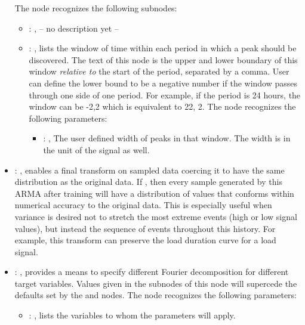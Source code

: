 \begin{itemize}
      The  node recognizes the following subnodes:
      \begin{itemize}
        \item {}: , 
          -- no description yet --

        \item {}: , 
          lists the window of time within each period in which a peak should be discovered.
          The text of this node is the upper and lower boundary of this
          window \emph{relative to} the start of the period, separated by a comma.
          User can define the lower bound to be a negative
          number if the window passes through one side of one period. For example, if the period is
          24                                                  hours, the window can be -2,2 which is
          equivalent to 22, 2.
          The  node recognizes the following parameters:
            \begin{itemize}
              \item {}: , 
                The user defined  width of peaks in that window. The width is in the unit of the
                signal as well.
          \end{itemize}
      \end{itemize}

    \item {}: , 
      enables a final transform on sampled                                                    data
      coercing it to have the same distribution as the original data. If , then
      every                                                    sample generated by this ARMA after
      training will have a distribution of values that conforms within
      numerical accuracy to the original data. This is especially useful when variance is desired
      not to stretch                                                    the most extreme events
      (high or low signal values), but instead the sequence of events throughout this
      history. For example, this transform can preserve the load duration curve for a load signal.

    \item {}: , 
      provides a means to specify different Fourier
      decomposition for different target variables.  Values given in the subnodes of this node will
      supercede                                                    the defaults set by the
       and  nodes.
      The  node recognizes the following parameters:
        \begin{itemize}
          \item {}: , 
            lists the variables to whom                     the  parameters
            will apply.
      \end{itemize}


\end{itemize}
